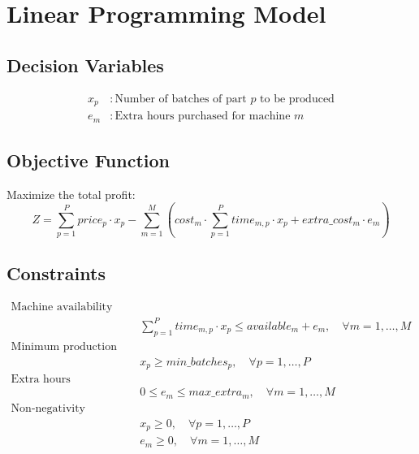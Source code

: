 \documentclass{article}
\begin{document}
\section*{Linear Programming Model}

\subsection*{Decision Variables}
\begin{align*}
x_p &: \text{Number of batches of part } p \text{ to be produced} \\
e_m &: \text{Extra hours purchased for machine } m
\end{align*}

\subsection*{Objective Function}
Maximize the total profit:
\[
Z = \sum_{p=1}^{P} price_p \cdot x_p - \sum_{m=1}^{M} \left( cost_m \cdot \sum_{p=1}^{P} time_{m,p} \cdot x_p + extra\_cost_m \cdot e_m \right)
\]

\subsection*{Constraints}
\begin{align*}
\text{Machine availability constraints:} \\
& \sum_{p=1}^{P} time_{m,p} \cdot x_p \leq available_m + e_m, \quad \forall m = 1, \ldots, M \\

\text{Minimum production constraints:} \\
& x_p \geq min\_batches_p, \quad \forall p = 1, \ldots, P \\

\text{Extra hours constraints:} \\
& 0 \leq e_m \leq max\_extra_m, \quad \forall m = 1, \ldots, M \\

\text{Non-negativity constraints:} \\
& x_p \geq 0, \quad \forall p = 1, \ldots, P \\
& e_m \geq 0, \quad \forall m = 1, \ldots, M 
\end{align*}
\end{document}
